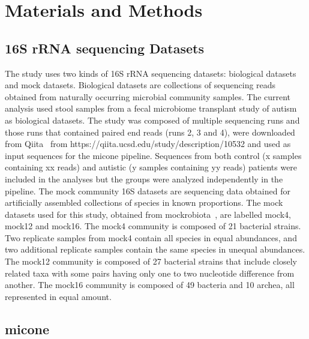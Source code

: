 
\section*{Materials and Methods}

  \subsection*{16S rRNA sequencing Datasets}

  \vspace{-5mm}
    The study uses two kinds of 16S rRNA sequencing datasets: biological datasets and mock datasets.
    Biological datasets are collections of sequencing reads obtained from naturally occurring microbial community samples.
    The current analysis used stool samples from a fecal microbiome transplant study of autism~\cite{Kang2017} as biological datasets.
    The study was composed of multiple sequencing runs and those runs that contained paired end reads (runs 2, 3 and 4), were downloaded from Qiita~\cite{qiita} from https://qiita.ucsd.edu/study/description/10532 and used as input sequences for the \ac{micone} pipeline.
    Sequences from both control (x samples containing xx reads) and autistic (y samples containing yy reads) patients were included in the analyses but the groups were analyzed independently in the pipeline.
    The mock community 16S datasets are sequencing data obtained for artificially assembled collections of species in known proportions.
    The mock datasets used for this study, obtained from mockrobiota~\cite{Bokulich2016}, are labelled mock4, mock12 and mock16.
    The mock4 community is composed of 21 bacterial strains.
    Two replicate samples from mock4 contain all species in equal abundances, and two additional replicate samples contain the same species in unequal abundances.
    The mock12 community is composed of 27 bacterial strains that include closely related taxa with some pairs having only one to two nucleotide difference from another.
    The mock16 community is composed of 49 bacteria and 10 archea, all represented in equal amount.

  \subsection*{\ac{micone}}

